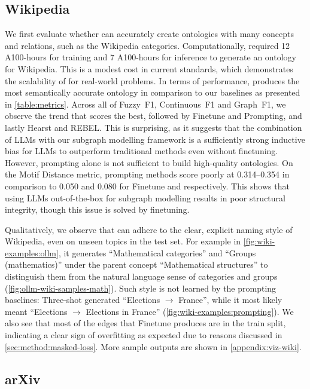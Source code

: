

\subsection{Wikipedia}

We first evaluate whether \name can accurately create ontologies with many concepts and relations, such as the Wikipedia categories. Computationally, \name required 12 A100-hours for training and 7 A100-hours for inference to generate an ontology for Wikipedia. This is a modest cost in current standards, which demonstrates the scalability of \name for real-world problems.
In terms of performance, \name produces the most semantically accurate ontology in comparison to our baselines as presented in \cref{table:metrics}. Across all of Fuzzy~F1, Continuous~F1 and Graph~F1, we observe the trend that \name scores the best, followed by Finetune and Prompting, and lastly Hearst and REBEL. This is surprising, as it suggests that the combination of LLMs with our subgraph modelling framework is a sufficiently strong inductive bias for LLMs to outperform traditional methods even without finetuning. However, prompting alone is not sufficient to build high-quality ontologies.
On the Motif Distance metric, prompting methods score poorly at 0.314--0.354 in comparison to 0.050 and 0.080 for Finetune and \name respectively. This shows that using LLMs out-of-the-box for subgraph modelling results in poor structural integrity, though this issue is solved by finetuning.



Qualitatively, we observe that \name can adhere to the clear, explicit naming style of Wikipedia, even on unseen topics in the test set. For example in \cref{fig:wiki-examples:ollm}, it generates ``Mathematical categories'' and ``Groups (mathematics)'' under the parent concept ``Mathematical structures'' to distinguish them from the natural language sense of categories and groups (\cref{fig:ollm-wiki-samples-math}). Such style is not learned by the prompting baselines: Three-shot generated ``Elections $\to$ France'', while it most likely meant ``Elections $\to$ Elections in France'' (\cref{fig:wiki-examples:prompting}). We also see that most of the edges that Finetune produces are in the train split, indicating a clear sign of overfitting as expected due to reasons discussed in \cref{sec:method:masked-loss}. More sample outputs are shown in \cref{appendix:viz-wiki}.

\subsection{arXiv}


